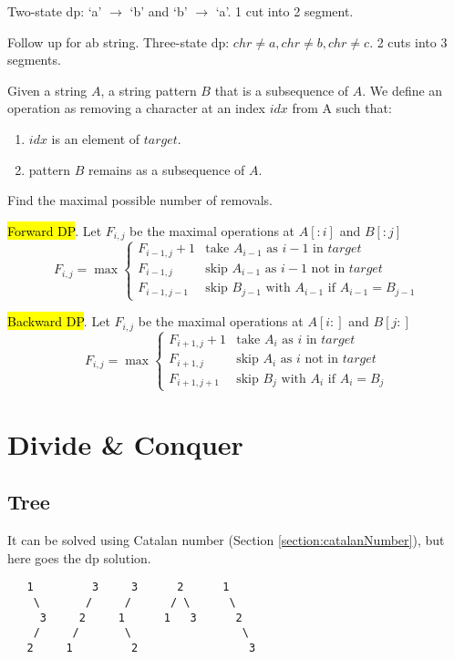 Two-state dp: `a' $\rightarrow$ `b' and  `b' $\rightarrow$ `a'. 1 cut into 2 segment.

 Follow up for ab string. Three-state dp: $chr \neq a, chr \neq b, chr \neq c$. 2 cuts into 3 segments.

 Given a string $A$, a string pattern $B$ that is a subsequence of $A$.
We define an operation as removing a character at an index $idx$ from A such that:
\begin{enumerate}
\item $idx$ is an element of $target$.
\item pattern $B$ remains as a subsequence of $A$. 
\end{enumerate}
Find the maximal possible number of removals.

\hl{Forward DP}. Let $F_{i,j}$ be the maximal operations at $A[:i]$ and $B[:j]$
\[
F_{i,j} = \max
\begin{cases}
F_{i-1,j} + 1 &\text{take $A_{i-1}$ as $i-1$ in $target$}\\
F_{i-1,j} &\text{skip $A_{i-1}$ as $i-1$ not in $target$} \\
F_{i-1,j-1}&\text{skip $B_{j-1}$ with $A_{i-1}$ if $A_{i-1} = B_{j-1}$}
\end{cases}
\]

\hl{Backward DP}. Let $F_{i,j}$ be the maximal operations at $A[i:]$ and $B[j:]$
\[
F_{i,j} = \max
\begin{cases}
F_{i+1,j} + 1 &\text{take $A_i$ as $i$ in $target$}\\
F_{i+1,j} &\text{skip $A_i$ as $i$ not in $target$} \\
F_{i+1,j+1}&\text{skip $B_j$ with $A_i$ if $A_i = B_j$}
\end{cases}
\]

\section{Divide \& Conquer}
\subsection{Tree}
 It can be solved using Catalan number (Section \ref{section:catalanNumber}), but here goes the dp solution. 
\begin{lstlisting}
   1         3     3      2      1
    \       /     /      / \      \
     3     2     1      1   3      2
    /     /       \                 \
   2     1         2                 3
\end{lstlisting}

